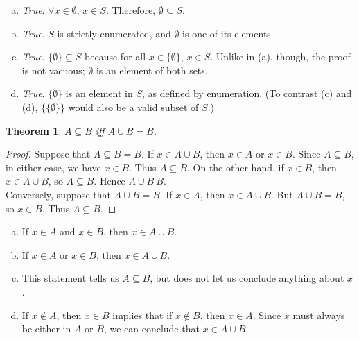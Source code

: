 \documentclass[12pt]{scrartcl} %
\newtheorem*{theorem}{Theorem}
\begin{document}
\begin{enumerate}[(a)]
	\item \emph{True}. $\forall x \in \emptyset$, $x \in S$. Therefore, $\emptyset \subseteq S$.
	\item \emph{True}. $S$ is strictly enumerated, and $\emptyset$ is one of its elements.
	\item \emph{True}. $\{\emptyset\} \subseteq S$ because for all $x \in \{\emptyset\}$, $x \in S$. Unlike in (a), though, the proof is not vacuous; $\emptyset$ is an element of both sets.
	\item \emph{True}. $\{\emptyset\}$ is an element in $S$, as defined by enumeration. (To contrast (c) and (d), $\{\{\emptyset\}\}$ would also be a valid subset of $S$.)
\end{enumerate}
\begin{theorem}
$A \subseteq B$ iff $A \cup B = B$.
\end{theorem}
\begin{proof}
Suppose that $A \subseteq B = B$. If $x \in A \cup B$, then $x \in A$ or $x \in B$.
Since $A \subseteq B$, in either case, we have $x \in B$. Thus $A \subseteq B$.
On the other hand, if $x \in B$, then $x \in A \cup B$, so $A \subseteq B$. Hence $A \cup B \ B$. \\
Conversely, suppose that $A \cup B = B$. If $x \in A$, then $x \in A \cup B$. But $A \cup B = B$, so $x \in B$. Thus $A \subseteq B$.
\end{proof}
\begin{enumerate}[(a)]
	\item If $x \in A$ and $x \in B$, then $x \in A \cup B$.
	\item If $x \in A$ or $x \in B$, then $x \in A \cup B$.
	\item This statement tells us $A \subseteq B$, but does not let us conclude anything about $x$.
	\item If $x \notin A$, then $x \in B$ implies that if $x \notin B$, then $x \in A$. Since $x$ must always be either in $A$ or $B$, we can conclude that $x \in A \cup B$.
\end{enumerate}
\end{document}
